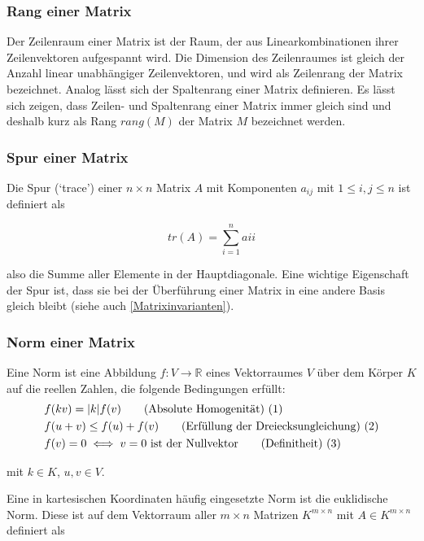 \documentclass[a4paper,fontsize=12pt,toc=bib,halfparskip]{scrartcl}
\begin{document}
\subsubsection{Rang einer Matrix}
Der Zeilenraum einer Matrix ist der Raum, der aus Linearkombinationen ihrer Zeilenvektoren aufgespannt wird. Die Dimension des Zeilenraumes ist gleich der Anzahl linear unabh\"angiger Zeilenvektoren, und wird als Zeilenrang der Matrix bezeichnet. Analog l\"asst sich der Spaltenrang einer Matrix definieren. Es l\"asst sich zeigen, dass Zeilen- und Spaltenrang einer Matrix immer gleich sind und deshalb kurz als Rang $rang(M)$ der Matrix $M$ bezeichnet werden.

\subsubsection{Spur einer Matrix}
Die Spur (`trace') einer $n\times n$ Matrix $A$ mit Komponenten $a_{ij}$ mit $1 \leq i,j \leq n$ ist definiert als

\begin{equation}
	tr(A) = \sum_{i = 1}^{n} a{ii}
\end{equation}

also die Summe aller Elemente in der Hauptdiagonale. Eine wichtige Eigenschaft der Spur ist, dass sie bei der \"Uberf\"uhrung einer Matrix in eine andere Basis gleich bleibt (siehe auch \ref{Matrixinvarianten}).


\subsubsection{Norm einer Matrix}
Eine Norm ist eine Abbildung $f: V \rightarrow \mathbb{R}$ eines Vektorraumes $V$ \"uber dem K\"orper $K$ auf die reellen Zahlen, die folgende Bedingungen erf\"ullt:
\begin{align}
	&f(kv) = |k|f(v) \tag{Absolute Homogenit\"at) (\addtocounter{equation}{1}\theequation}\\
	&f(u+v) \leq f(u) + f(v) \tag{Erf\"ullung der Dreiecksungleichung) (\addtocounter{equation}{1}\theequation}\\
	&f(v) = 0 \iff v=0 \text{ ist der Nullvektor} \tag{Definitheit) (\addtocounter{equation}{1}\theequation}
\end{align}

mit $k \in K$, $u,v \in V$.


Eine in kartesischen Koordinaten h\"aufig eingesetzte Norm ist die euklidische Norm. Diese ist auf dem Vektorraum aller $m \times n$ Matrizen $K^{m\times n}$ mit $A \in K^{m\times n}$ definiert als
\end{document}
